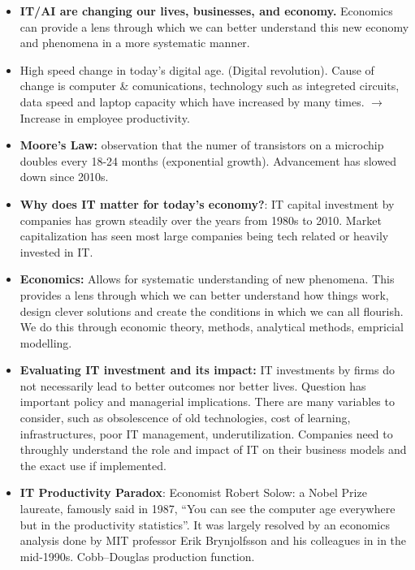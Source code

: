 \documentclass[12pt, landscape]{article}
\begin{document}
\begin{multicols*}{3}
\begin{itemize}
	\item \textbf{IT/AI are changing our lives, businesses, and economy.} Economics can provide a lens through which we can better understand this new economy and phenomena in a more systematic manner.
	\item High speed change in today’s digital age. (Digital revolution). Cause of change is computer \& comunications, technology such as integreted circuits, data speed and laptop capacity which have increased by many times. $\rightarrow$ Increase in employee productivity.
	\item \textbf{Moore’s Law:} observation that the numer of transistors on a microchip doubles every 18-24 months (exponential growth). Advancement has slowed down since 2010s.
	\item \textbf{Why does IT matter for today's economy?}: IT capital investment by companies has grown steadily over the years from 1980s to 2010. Market capitalization has seen most large companies being tech related or heavily invested in IT.
	\item \textbf{Economics:} Allows for systematic understanding of new phenomena. This provides a lens through which we can better understand how things work, design clever solutions and create the conditions in which we can all flourish. We do this through economic theory, methods, analytical methods, empricial modelling.
	\item \textbf{Evaluating IT investment and its impact:} IT investments by firms do not necessarily lead to better outcomes nor better lives. Question has important policy and managerial implications. There are many variables to consider, such as obsolescence of old technologies, cost of learning, infrastructures, poor IT management, underutilization. Companies need to throughly understand the role and impact of IT on their business models and the exact use if implemented.
	\item \textbf{IT Productivity Paradox}: Economist Robert Solow: a Nobel Prize laureate, famously said in 1987, “You can see the computer age everywhere but in the productivity statistics”. It was largely resolved by an economics analysis done by MIT professor Erik Brynjolfsson and his colleagues in in the mid-1990s. Cobb–Douglas production function.
\end{itemize}


\end{multicols*}
\end{document}

